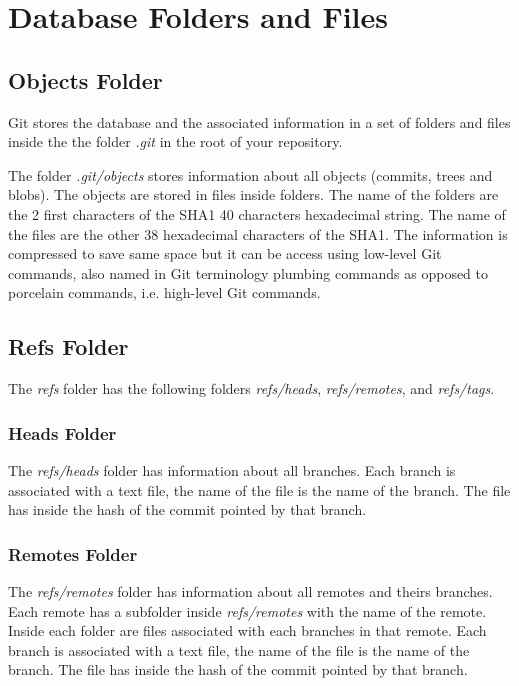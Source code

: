 \section{Database Folders and Files}

\subsection{Objects Folder}

Git stores the database and the associated information in a set of folders and files inside the the folder \emph{.git} in the root of your repository.

The folder \emph{.git/objects} stores information about all objects (commits, trees and blobs).
The objects are stored in files inside folders.
The name of the folders are the 2 first characters of the SHA1 40 characters hexadecimal string.
The name of the files are the other 38 hexadecimal characters of the SHA1.
The information is compressed to save same space but it can be access using low-level Git commands, also named in Git terminology plumbing commands as opposed to porcelain commands, i.e. high-level Git commands.

\subsection{Refs Folder}

The \emph{refs} folder has the following folders \emph{refs/heads}, \emph{refs/remotes}, and \emph{refs/tags}.

\subsubsection{Heads Folder}
The \emph{refs/heads} folder has information about all branches.
Each branch is associated with a text file, the name of the file is the name of the branch.
The file has inside the hash of the commit pointed by that branch.

\subsubsection{Remotes Folder}
The \emph{refs/remotes} folder has information about all remotes and theirs branches.
Each remote has a subfolder inside \emph{refs/remotes} with the name of the remote.
Inside each folder are files associated with each branches in that remote.
Each branch is associated with a text file, the name of the file is the name of the branch.
The file has inside the hash of the commit pointed by that branch.

